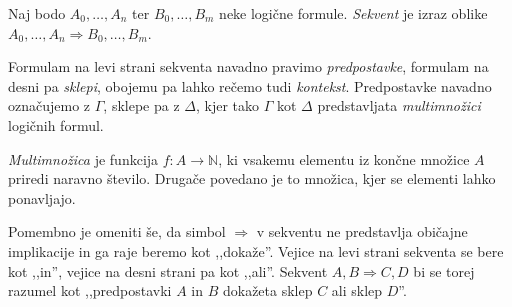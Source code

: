 \begin{definicija}
    Naj bodo $A_0,\ldots,A_n$ ter $B_0,\ldots,B_m$ neke logične formule. \emph{Sekvent} je izraz oblike $A_0,\ldots,A_n \Rightarrow B_0,\ldots,B_m$.
\end{definicija}

Formulam na levi strani sekventa navadno pravimo \emph{predpostavke}, formulam na desni pa \emph{sklepi}, obojemu pa lahko rečemo tudi \emph{kontekst}. Predpostavke navadno označujemo z $\Gamma$, sklepe pa z $\Delta$, kjer tako $\Gamma$ kot $\Delta$ predstavljata \emph{multimnožici} logičnih formul.

\begin{definicija}
    \emph{Multimnožica} je funkcija $f:A\to\mathbb{N}$, ki vsakemu elementu iz končne množice $A$ priredi naravno število. Drugače povedano je to množica, kjer se elementi lahko ponavljajo.
\end{definicija}
Pomembno je omeniti še, da simbol $\Rightarrow$ v sekventu ne predstavlja običajne implikacije in ga raje beremo kot ,,dokaže''. Vejice na levi strani sekventa se bere kot ,,in'', vejice na desni strani pa kot ,,ali''. Sekvent $A,B \Rightarrow C,D$ bi se torej razumel kot ,,predpostavki $A$ in $B$ dokažeta sklep $C$ ali sklep $D$''.
